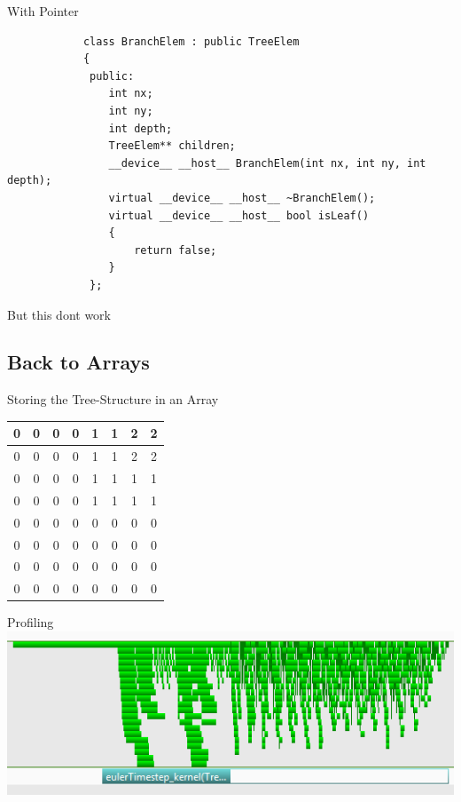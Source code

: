 \documentclass[fleqn,11pt,aspectratio=43]{beamer}
\begin{document}
\begin{frame}[fragile]{With Pointer}
	\begin{verbatim}
			class BranchElem : public TreeElem
			{
			 public:
			    int nx;
			    int ny;
			    int depth;
			    TreeElem** children;
			    __device__ __host__ BranchElem(int nx, int ny, int depth);
			    virtual __device__ __host__ ~BranchElem();
			    virtual __device__ __host__ bool isLeaf()
			    {
			        return false;
			    }
			 };
	\end{verbatim}
\end{frame}

\begin{frame}{But this dont work}
\end{frame}

\subsection{Back to Arrays}
	\begin{frame}{Storing the Tree-Structure in an Array}
		\centering
		\begin{tabular}{ | c | c | c | c | c | c | c | c |}
			\hline
  			0 & 0 & 0 & 0 & 1 & 1 & 2 & 2 \\ \hline
  			0 & 0 & 0 & 0 & 1 & 1 & 2 & 2 \\ \hline
  			0 & 0 & 0 & 0 & 1 & 1 & 1 & 1 \\ \hline
			0 & 0 & 0 & 0 & 1 & 1 & 1 & 1 \\ \hline
  			0 & 0 & 0 & 0 & 0 & 0 & 0 & 0 \\ \hline
  			0 & 0 & 0 & 0 & 0 & 0 & 0 & 0 \\ \hline
  			0 & 0 & 0 & 0 & 0 & 0 & 0 & 0 \\ \hline
  			0 & 0 & 0 & 0 & 0 & 0 & 0 & 0 \\ \hline
		\end{tabular}
	\end{frame}
	
	\begin{frame}{Profiling}
		\centering
		\includegraphics[width=1\textwidth]{profilingArray.png}
	\end{frame}
\end{document}

